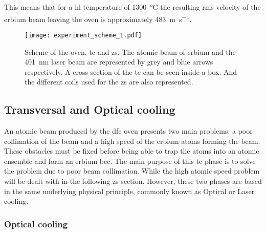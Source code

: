This means that for a \ac{hl} temperature of \SI{1300}{\degreeCelsius} the resulting \ac{rms} velocity of the erbium beam leaving the oven is approximately \SI{483}{\meter\per\second}.

\begin{figure}[!htbp]\centering
	\texttt{[image: experiment\_scheme\_1.pdf]}
	\caption[Oven, \acl{tc} and \acl{zs} schemes]{Scheme of the oven, \acl{tc} and \acl{zs}. The atomic beam of erbium and the \SI{401}{\nano\meter} laser beam are represented by grey and blue arrows respectively. A cross section of the \acl{tc} can be seen inside a box. And the different coils used for the \acl{zs} are also represented.}\label{fig:experiment_scheme_1}
\end{figure}

\subsection{Transversal and Optical cooling}

An atomic beam produced by the \ac{dfc} oven presents two main problems: a poor collimation of the beam and a high speed of the erbium atoms forming the beam. These obstacles must be fixed before being able to trap the atoms into an atomic ensemble and form an erbium \ac{bec}. The main purpose of this \acf{tc} phase is to solve the problem due to poor beam collimation. While the high atomic speed problem will be dealt with in the following \Acl{zs} section. However, these two phases are based in the same underlying physical principle, commonly known as Optical or Laser cooling. 

\subsubsection{Optical cooling}

